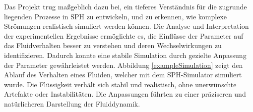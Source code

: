 \documentclass[a4paper, 12pt]{article}
\begin{document}
Das Projekt trug maßgeblich dazu bei, ein tieferes Verständnis für die zugrunde liegenden Prozesse in SPH zu entwickeln, und zu erkennen, wie komplexe Strömungen realistisch simuliert werden können. Die Analyse und Interpretation der experimentellen Ergebnisse ermöglichte es, die Einflüsse der Parameter auf das Fluidverhalten besser zu verstehen und deren Wechselwirkungen zu identifizieren. Dadurch konnte eine stabile Simulation durch gezielte Anpassung der Parameter gewährleistet werden.
Abbildung \ref{exampleSimulation} zeigt den Ablauf des Verhalten eines Fluiden, welcher mit dem SPH-Simulator simuliert wurde. Die Flüssigkeit verhält sich stabil und realistisch, ohne unerwünschte Artefakte oder Instabilitäten. Die Anpassungen führten zu einer präziseren und natürlicheren Darstellung der Fluiddynamik.

\begin{figure}[H]
	\centering
\end{figure}
\end{document}
